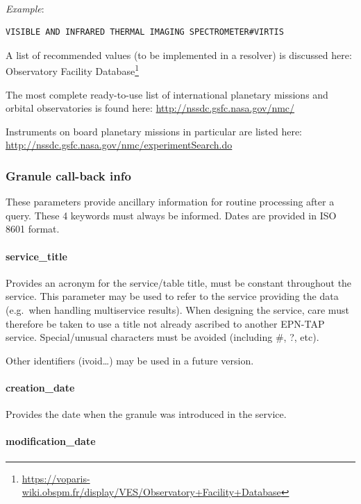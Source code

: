 \documentclass[11pt,a4paper]{ivoa}
\begin{document}
\textbf{\\}
\emph{Example}:

\begin{verbatim}
VISIBLE AND INFRARED THERMAL IMAGING SPECTROMETER#VIRTIS
\end{verbatim}

A list of recommended values (to be implemented in
a resolver) is discussed here: Observatory Facility
Database\footnote{\url{https://voparis-wiki.obspm.fr/display/VES/Observatory+Facility+Database}}

The most complete ready-to-use list of international
planetary missions and orbital observatories is found here:
\url{http://nssdc.gsfc.nasa.gov/nmc/}

Instruments on board planetary missions in particular are listed here:\\
\url{http://nssdc.gsfc.nasa.gov/nmc/experimentSearch.do}

\subsubsection{Granule call-back info}

These parameters provide ancillary information for routine processing
after a query. These 4 keywords must always be informed.
Dates are provided in ISO 8601 format.

\paragraph{service\_title}

Provides an acronym for the service/table title, must be constant
throughout the service. This parameter may be used to refer to the service
providing the data (e.g.\ when handling multiservice results). When
designing the service, care must therefore be taken to use a title not
already ascribed to another EPN-TAP service. Special/unusual characters
must be avoided (including \#, ?, etc).

Other identifiers (ivoid…) may be used in a future version.

\paragraph{creation\_date}

Provides the date when the granule was introduced in the service.

\paragraph{modification\_date}
\end{document}
